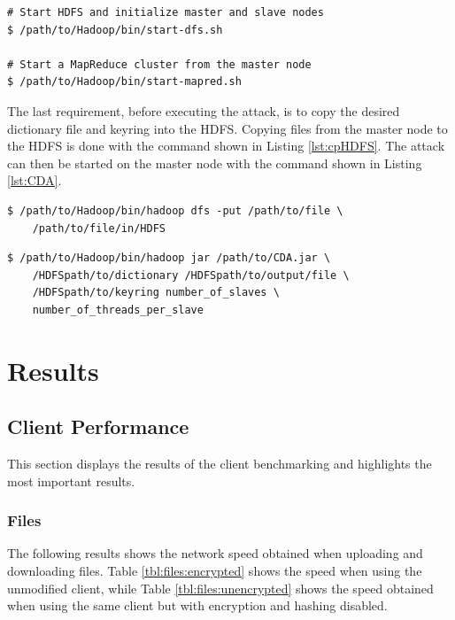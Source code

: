 \documentclass[pdftex,english,10pt,b5paper,twoside]{book}
\begin{document}
\lstset{language=bash, label=lst:hadoop, caption=Starting Hadoop cluster with HDFS}
\begin{lstlisting}
# Start HDFS and initialize master and slave nodes
$ /path/to/Hadoop/bin/start-dfs.sh

# Start a MapReduce cluster from the master node
$ /path/to/Hadoop/bin/start-mapred.sh
\end{lstlisting}

\noindent The last requirement, before executing the attack, is to copy the
desired dictionary file and keyring into the \ac{HDFS}. Copying files from the
master node to the \ac{HDFS} is done with the command shown in Listing
\ref{lst:cpHDFS}. The attack can then be started on the master node with the
command shown in Listing \ref{lst:CDA}.

\lstset{language=bash, label=lst:cpHDFS, caption=Copying files into HDFS}
\begin{lstlisting}
$ /path/to/Hadoop/bin/hadoop dfs -put /path/to/file \
    /path/to/file/in/HDFS
\end{lstlisting}

\lstset{language=bash, label=lst:CDA, caption=Executing the CDA attack}
\begin{lstlisting}
$ /path/to/Hadoop/bin/hadoop jar /path/to/CDA.jar \
    /HDFSpath/to/dictionary /HDFSpath/to/output/file \
    /HDFSpath/to/keyring number_of_slaves \
    number_of_threads_per_slave
\end{lstlisting}
\chapter{Results}
\section{Client Performance}
This section displays the results of the client benchmarking and highlights the
most important results.

\subsection{Files} The following results shows the network speed obtained when
uploading and downloading files. Table \ref{tbl:files:encrypted} shows the
speed when using the unmodified client, while Table \ref{tbl:files:unencrypted}
shows the speed obtained when using the same client but with encryption and
hashing disabled.
\end{document}
